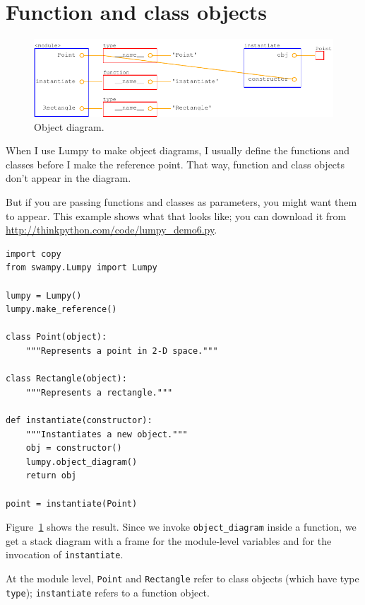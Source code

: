 \documentclass[10pt]{book}
\begin{document}
\section{Function and class objects}

\begin{figure}
\centerline
{\includegraphics[scale=0.7]{figs/lumpydemo6.pdf}}
\caption{Object diagram.}
\label{fig.lumpy6}
\end{figure}

When I use Lumpy to make object diagrams, I usually define the functions
and classes before I make the reference point.  That way, function
and class objects don't appear in the diagram.

But if you are passing functions and classes as parameters, you might
want them to appear.  This example shows what that looks like;
you can download it from
\url{http://thinkpython.com/code/lumpy_demo6.py}.

\begin{verbatim}
import copy
from swampy.Lumpy import Lumpy

lumpy = Lumpy()
lumpy.make_reference()

class Point(object):
    """Represents a point in 2-D space."""

class Rectangle(object):
    """Represents a rectangle."""

def instantiate(constructor):
    """Instantiates a new object."""
    obj = constructor()
    lumpy.object_diagram()
    return obj

point = instantiate(Point)
\end{verbatim}

Figure~\ref{fig.lumpy6} shows the result.  Since we invoke
\verb"object_diagram" inside a function, we get a stack diagram
with a frame for the module-level variables and for the invocation
of {\tt instantiate}.

At the module level, {\tt Point} and {\tt Rectangle} refer to
class objects (which have type {\tt type}); {\tt instantiate}
refers to a function object.
\end{document}

